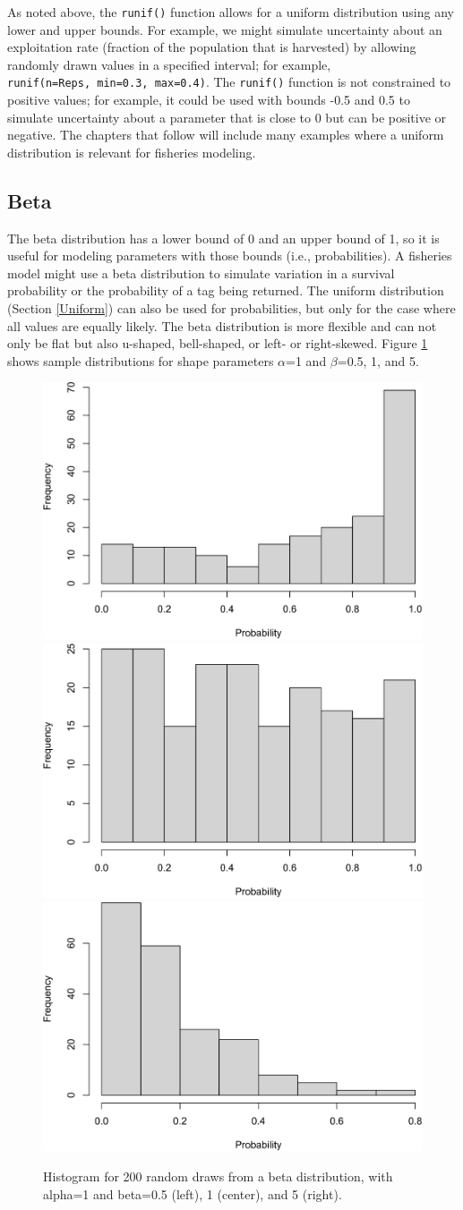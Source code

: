 \documentclass[
]{krantz}
\begin{document}
As noted above, the \texttt{runif()} function allows for a uniform distribution using any lower and upper bounds. For example, we might simulate uncertainty about an exploitation rate (fraction of the population that is harvested) by allowing randomly drawn values in a specified interval; for example, \texttt{runif(n=Reps,\ min=0.3,\ max=0.4)}. The \texttt{runif()} function is not constrained to positive values; for example, it could be used with bounds -0.5 and 0.5 to simulate uncertainty about a parameter that is close to 0 but can be positive or negative. The chapters that follow will include many examples where a uniform distribution is relevant for fisheries modeling.

\hypertarget{beta}{%
\subsection{Beta}\label{beta}}

The beta distribution has a lower bound of 0 and an upper bound of 1, so it is useful for modeling parameters with those bounds (i.e., probabilities). A fisheries model might use a beta distribution to simulate variation in a survival probability or the probability of a tag being returned. The uniform distribution (Section \ref{Uniform}) can also be used for probabilities, but only for the case where all values are equally likely. The beta distribution is more flexible and can not only be flat but also u-shaped, bell-shaped, or left- or right-skewed. Figure \ref{fig:Beta} shows sample distributions for shape parameters \(\alpha\)=1 and \(\beta\)=0.5, 1, and 5.

\begin{figure}
\includegraphics[width=0.33\linewidth]{bookdown_files/figure-latex/Beta-1} \includegraphics[width=0.33\linewidth]{bookdown_files/figure-latex/Beta-2} \includegraphics[width=0.33\linewidth]{bookdown_files/figure-latex/Beta-3} \caption{Histogram for 200 random draws from a beta distribution, with alpha=1 and beta=0.5  (left), 1 (center), and 5 (right).}\label{fig:Beta}
\end{figure}
\end{document}
